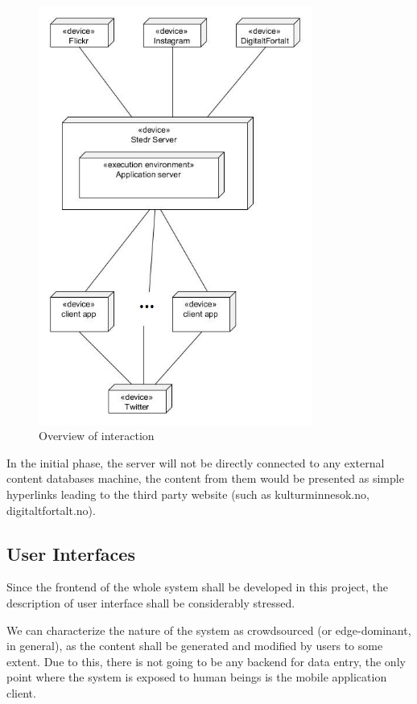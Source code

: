 \documentclass[11pt]{book}
\begin{document}
\begin{figure}[H]
      \centering
      \includegraphics[width=0.8\textwidth]{Figures/Architecture/deploymentView.jpg}
      \caption{Overview of interaction}
      \label{fig:req_overview}
\end{figure}

In the initial phase, the server will not be directly connected to any external content databases machine, the content from them would be presented as simple hyperlinks leading to the third party website (such as kulturminnesok.no, digitaltfortalt.no).

\subsection{User Interfaces}
Since the frontend of the whole system shall be developed in this project, the description of user interface shall be considerably stressed.

We can characterize the nature of the system as crowdsourced (or edge-dominant, in general), as the content shall be generated and modified by users to some extent. Due to this, there is not going to be any backend for data entry, the only point where the system is exposed to human beings is the mobile application client.
\end{document}
